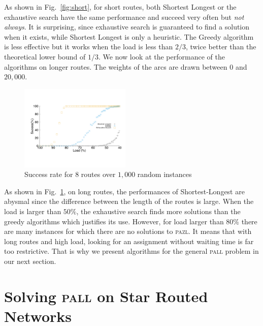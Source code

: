 \documentclass[a4paper,10pt]{IEEEtran}
\newcommand\pazl{\textsc{pazl}\xspace}
\newcommand\pall{\textsc{pall}\xspace}
\begin{document}
      
      As shown in Fig.~\ref{fig:short}, for short routes, both  Shortest Longest or the exhaustive search have the same performance and succeed very often but \emph{not always}. It is surprising, since exhaustive search is guaranteed to find a solution when it exists, while Shortest Longest is only a heuristic. The Greedy algorithm is less effective but it works when the load is less than $2/3$, twice better than the theoretical lower bound of $1/3$. We now look at the performance of the algorithms on longer routes. The weights of the arcs are drawn between $0$ and $20,000$.

   
\begin{figure}[h]

       \begin{center}
      \includegraphics[width=0.47\textwidth]{echec_longues.pdf}
      \end{center}
       
      \caption{Success rate for $8$ routes over $1,000$ random instances}\label{fig:long}
     \end{figure}
     
     As shown in Fig.~\ref{fig:long}, on long routes, the performances of Shortest-Longest are abysmal since the difference between the length of the routes is large.
       When the load is larger than $50\%$, the exhaustive search finds more solutions than the greedy algorithms which justifies its use. However, for load larger than $80\%$ there are many instances for which there are no solutions to \pazl.
        It means that with long routes and high load, looking for an assignment without waiting time is far too restrictive. That is why we present algorithms for the general \pall problem in our next section. 
     

         \section{Solving \pall on Star Routed Networks}\label{sec:PALL}
         
\end{document}
